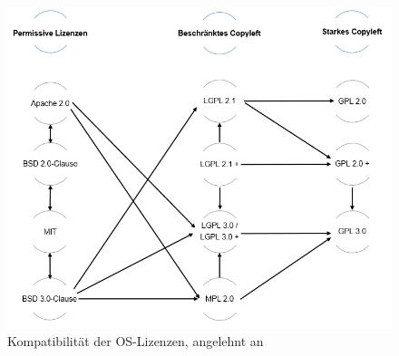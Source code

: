 \begin{figure}[h]
    \centering
    \includegraphics[scale=0.55]{Bilder/Kompatibilitaet.png}
    \caption{Kompatibilität der OS-Lizenzen, angelehnt an \cite[S. 65]{schaaf_open-source-lizenzen_2013}}
\end{figure}

 














